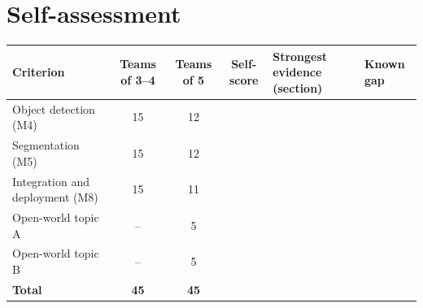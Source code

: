\documentclass[11pt,a4paper]{article}
\begin{document}
\section{Self-assessment}

{\small
\begin{tabularx}{\linewidth}{@{}l c c c Y Y@{}}
\toprule
Criterion & Teams of 3--4 & Teams of 5 & Self-score & Strongest evidence (section) & Known gap \\
\midrule
Object detection (M4) & 15 & 12 & & & \\
Segmentation (M5) & 15 & 12 & & & \\
Integration and deployment (M8) & 15 & 11 & & & \\
Open-world topic A & -- & 5 & & & \\
Open-world topic B & -- & 5 & & & \\
\midrule
\textbf{Total} & \textbf{45} & \textbf{45} & & & \\
\bottomrule
\end{tabularx}}
\end{document}
